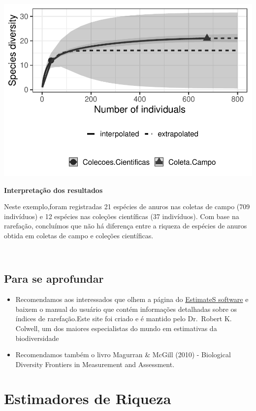 \documentclass[
]{book}
\begin{document}
\includegraphics{livro_r_ecologia_files/figure-latex/unnamed-chunk-42-1.pdf}

\textbf{Interpretação dos resultados}

Neste exemplo,foram registradas 21 espécies de anuros nas coletas de campo (709 indivíduos) e 12 espécies nas coleções científicas (37 indivíduos). Com base na rarefação, concluímos que não há diferença entre a riqueza de espécies de anuros obtida em coletas de campo e coleções científicas.

~

\hypertarget{para-se-aprofundar}{%
\section{Para se aprofundar}\label{para-se-aprofundar}}

\begin{itemize}
\item
  Recomendamos aos interessados que olhem a página do \href{http://viceroy.eeb.uconn.edu/estimates}{EstimateS software} e baixem o manual do usuário que contém informações detalhadas sobre os índices de rarefação.Este site foi criado e é mantido pelo Dr.~Robert K. Colwell, um dos maiores especialistas do mundo em estimativas da biodiversidade
\item
  Recomendamos também o livro Magurran \& McGill (2010) - Biological Diversity Frontiers in Measurement and Assessment.
\end{itemize}

\hypertarget{estimadores-de-riqueza}{%
\chapter{Estimadores de Riqueza}\label{estimadores-de-riqueza}}
\end{document}
